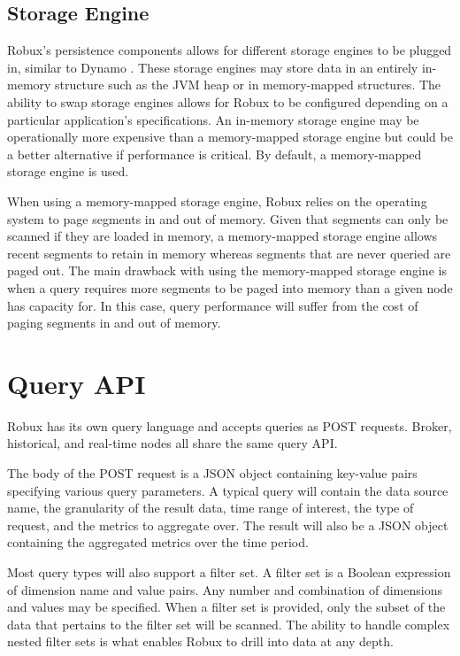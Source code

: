 \documentclass{sig-alternate-2013}
\begin{document}
\subsection{Storage Engine}
Robux’s persistence components allows for different storage engines to be
plugged in, similar to Dynamo \cite{decandia2007dynamo}. These storage engines
may store data in an entirely in-memory structure such as the JVM heap or in
memory-mapped structures. The ability to swap storage engines allows for Robux
to be configured depending on a particular application’s specifications. An
in-memory storage engine may be operationally more expensive than a
memory-mapped storage engine but could be a better alternative if performance
is critical. By default, a memory-mapped storage engine is used.

When using a memory-mapped storage engine, Robux relies on the operating system
to page segments in and out of memory. Given that segments can only be scanned
if they are loaded in memory, a memory-mapped storage engine allows recent
segments to retain in memory whereas segments that are never queried are paged
out. The main drawback with using the memory-mapped storage engine is when a
query requires more segments to be paged into memory than a given node has
capacity for. In this case, query performance will suffer from the cost of
paging segments in and out of memory.

\section{Query API}
\label{sec:query-api}
Robux has its own query language and accepts queries as POST requests. Broker,
historical, and real-time nodes all share the same query API.

The body of the POST request is a JSON object containing key-value pairs
specifying various query parameters. A typical query will contain the data
source name, the granularity of the result data, time range of interest, the
type of request, and the metrics to aggregate over. The result will also be a
JSON object containing the aggregated metrics over the time period.

Most query types will also support a filter set. A filter set is a Boolean
expression of dimension name and value pairs. Any number and combination of
dimensions and values may be specified. When a filter set is provided, only
the subset of the data that pertains to the filter set will be scanned. The
ability to handle complex nested filter sets is what enables Robux to drill
into data at any depth.
\end{document}
